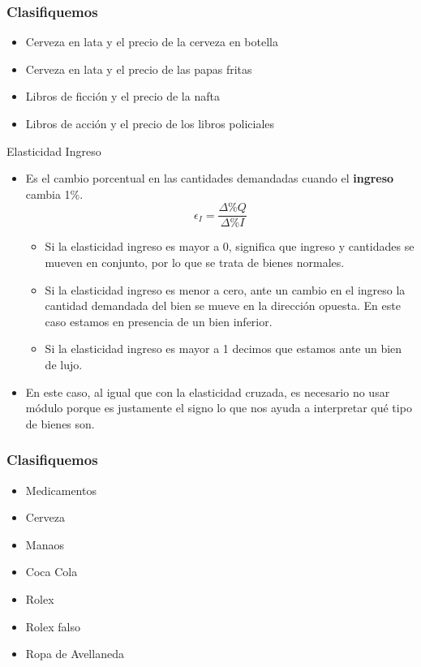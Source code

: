 \documentclass{beamer}
\begin{document}
\begin{frame}
\frametitle{Clasifiquemos}
\begin{itemize}
    \item Cerveza en lata y el precio de la cerveza en botella
    \item Cerveza en lata y el precio de las papas fritas
    \item Libros de ficción y el precio de la nafta
    \item Libros de acción y el precio de los libros policiales
\end{itemize}
\end{frame}


\begin{frame}{Elasticidad Ingreso}
  \begin{itemize}
    \item Es el cambio porcentual en las cantidades demandadas cuando el \textbf{ingreso} cambia 1\%.
    \begin{equation*}
      \epsilon_I = \frac{\Delta \% Q}{\Delta \% I}
    \end{equation*}    
    \begin{itemize}
        \item Si la elasticidad ingreso es mayor a 0, significa que ingreso y cantidades se mueven en conjunto, por lo que se trata de bienes normales.
        \item Si la elasticidad ingreso es menor a cero, ante un cambio en el ingreso la cantidad demandada del bien se mueve en la dirección opuesta. En este caso estamos en presencia de un bien inferior.
        \item Si la elasticidad ingreso es mayor a 1 decimos que estamos ante un bien de lujo.
    \end{itemize}
    \item  En este caso, al igual que con la elasticidad cruzada, es necesario no usar módulo porque es justamente el signo lo que nos ayuda a interpretar qué tipo de bienes son.
\end{itemize}
\end{frame}



\begin{frame}
\frametitle{Clasifiquemos}
\begin{itemize}
    \item Medicamentos
    \item Cerveza
    \item Manaos
    \item Coca Cola
    \item Rolex
    \item Rolex falso
    \item Ropa de Avellaneda
    
\end{itemize}
\end{frame}
\end{document}
